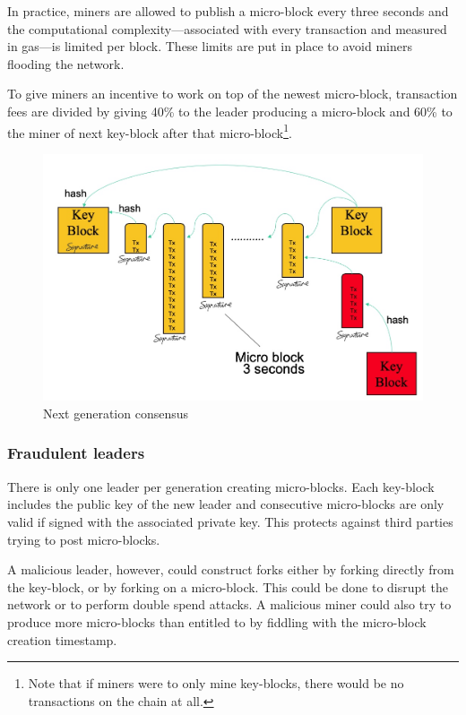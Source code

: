 In practice, miners are allowed to publish a micro-block every three seconds
and the computational complexity---associated with every transaction and
measured in gas---is limited per block. These limits are put in place to avoid
miners flooding the network.

To give miners an incentive to work on top of the newest micro-block,
transaction fees are divided by giving 40\% to the leader producing a
micro-block and 60\% to the miner of next key-block after that
micro-block\footnote{Note that if miners
  were to only mine key-blocks, there would be no transactions on the
  chain at all.}.

\begin{figure}
   \includegraphics[scale=0.3]{keymicro.jpg}
   \caption{Next generation consensus}
   \label{ng-mining}
\end{figure}

\subsubsection{Fraudulent leaders}

There is only one leader per generation creating micro-blocks. Each key-block
includes the public key of the new leader and consecutive micro-blocks are
only valid if signed with the associated private key. This protects
against third parties trying to post micro-blocks.

A malicious leader, however, could construct forks either by forking directly
from the key-block, or by forking on a micro-block. This could be done to
disrupt the network or to perform double spend attacks. A malicious miner could
also try to produce more micro-blocks than entitled to by fiddling with the
micro-block creation timestamp.

